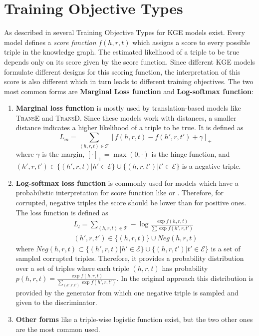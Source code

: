 \section{Training Objective Types}
As described in \cite{cai2017kbgan} several Training Objective Types for \ac{KGE} models exist.
Every model defines a \textit{score function} $f(h,r,t)$ which assigns a score to every possible triple in the knowledge graph.
The estimated likelihood of a triple to be true depends only on its score given by the score function.
Since different \ac{KGE} models formulate different designs for this scoring function, the interpretation of this score is also different which in turn leads to different training objectives.
The two most common forms are \textbf{Marginal Loss function} and \textbf{Log-softmax function}:
\begin{enumerate}
    \item \textbf{Marginal loss function} is mostly used by translation-based models like \textsc{TransE} and \textsc{TransD}.
    Since these models work with distances, a smaller distance indicates a higher likelihood of a triple to be true.
    It is defined as 
    \begin{equation}
        L_{m}=\sum_{(h,r,t)\in\mathcal{T}}[f(h,r,t)-f(h',r,t')+\gamma]_+\label{eq:marginalloss}
    \end{equation}
    where $\gamma$ is the margin, $[\cdot]_+=\max(0,\cdot)$ is the hinge function, and $(h',r,t')\in\{(h',r,t)|h'\in\mathcal{E}\}\cup\{(h,r,t')|t'\in\mathcal{E}\}$ is a negative triple.
    
    \item \textbf{Log-softmax loss function} is commonly used for models which have a probabilistic interpretation for score function like \distmult or \complex.
    Therefore, for corrupted, negative triples the score should be lower than for positive ones.
    The loss function is defined as
    \begin{multline}
        L_{l}=\sum_{(h,r,t)\in\mathcal{T}}-\log \frac{\exp f(h,r,t)}{\sum\exp f(h',r,t')}\\
        (h',r,t')\in\{(h,r,t)\}\cup Neg(h,r,t)\label{eq:nllloss}
    \end{multline}
    where $Neg(h,r,t)\subset\{(h',r,t)|h'\in\mathcal{E}\}\cup\{(h,r,t')|t'\in\mathcal{E}\}$ is a set of sampled corrupted triples.
    Therefore, it provides a probability distribution over a set of triples where each triple $(h, r, t)$ has probability $p(h,r,t)=\frac{\exp f(h,r,t)}{\sum_{(h',r,t')}\exp f(h',r,t')}$.
    In the original \kbgan approach this distribution is provided by the generator from which one negative triple is sampled and given to the discriminator.

    \item \textbf{Other forms} like a triple-wise logistic function \cite{ConvE} exist, but the two other ones are the most common used.
\end{enumerate}





